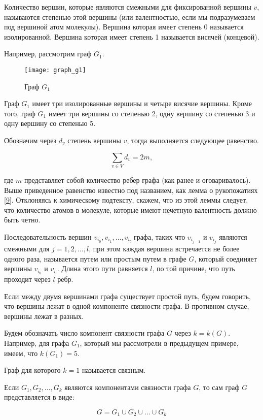\documentclass{article}
\begin{document}
Количество вершин, которые являются смежными для фиксированной вершины $v$, называются степенью этой вершины (или валентностью, если мы подразумеваем под вершиной атом молекулы). Вершина которая имеет степень 0 называется изолированной. Вершина которая имеет степень 1 называется висячей (концевой).

\newpage
Например, рассмотрим граф $G_1$.

\begin{figure}[h]
\texttt{[image: graph\_g1]}
\centering
\caption{Граф $G_1$}
\end{figure}


Граф $G_1$ имеет три изолированные вершины и четыре висячие вершины. Кроме того, граф $G_1$ имеет три вершины со степенью 2, одну вершину со степенью 3 и одну вершину со степенью 5.

Обозначим через $d_{v}$ степень вершины $v$, тогда выполняется следующее равенство.

$$ \sum_{v \in V} d_{v} = 2 m, $$

где $m$ представляет собой количество ребер графа (как ранее и оговаривалось). 
Выше приведенное равенство известно под названием, как лемма о рукопожатиях \hyperlink{handshaking_lemma}{[9]}. Отклоняясь к химическому подтексту, скажем, что из этой леммы следует, что количество атомов в молекуле, которые имеют нечетную валентность должно быть четно.

Последовательность вершин $v_{i_0}, v_{i_1}, \dots, v_{i_l}$ графа, таких что $v_{i_{j - 1}}$ и $v_{i_j}$ являются смежными для $j = 1, 2, \dots, l$, при этом каждая вершина встречается не более одного раза, называется путем или простым путем в графе $G$, который соединяет вершины $v_{i_0}$ и $v_{i_l}$. Длина этого пути равняется $l$, по той причине, что путь проходит через $l$ ребр.

Если между двумя вершинами графа существует простой путь, будем говорить, что вершины лежат в одной компоненте связности графа. В противном случае, вершины лежат в разных.

Будем обозначать число компонент связности графа $G$ через $k = k(G)$.
Например, для графа $G_1$, который мы рассмотрели в предыдущем примере, имеем, что $k(G_1) = 5$.

Граф для которого $k = 1$ называется связным.

Если $G_1, G_2, \dots, G_k$ являются компонентами связности графа $G$, то сам граф $G$ представляется в виде:

$$ G = G_1 \cup G_2 \cup \dots \cup G_k $$
\end{document}
